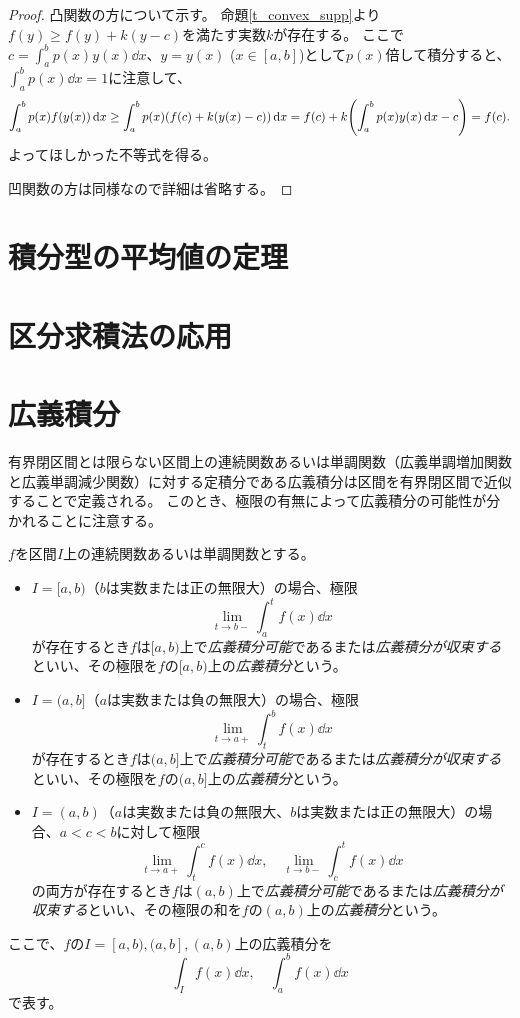 \begin{proof}
凸関数の方について示す。
命題\ref{t_convex_supp}より$f(y) \ge f(y)+k(y-c)$を満たす実数$k$が存在する。
ここで$c = \int_a^b p(x)y(x)\dd{x}$、$y = y(x)$ ($x \in [a, b]$)として$p(x)$倍して積分すると、$\int_a^b p(x)\dd{x} = 1$に注意して、
$$
\int_a^b p(x)f(y(x))\dd{x} \ge \int_a^b p(x)(f(c)+k(y(x)-c))\dd{x} = f(c)+k\qty(\int_a^b p(x)y(x)\dd{x}-c) = f(c).
$$
よってほしかった不等式を得る。

凹関数の方は同様なので詳細は省略する。
\end{proof}

\section{積分型の平均値の定理}

\section{区分求積法の応用}

\section{広義積分}

有界閉区間とは限らない区間上の連続関数あるいは単調関数（広義単調増加関数と広義単調減少関数）に対する定積分である広義積分は区間を有界閉区間で近似することで定義される。
このとき、極限の有無によって広義積分の可能性が分かれることに注意する。

\begin{definition}[広義積分]
$f$を区間$I$上の連続関数あるいは単調関数とする。
\begin{itemize}
\item
$I = [a, b)$（$b$は実数または正の無限大）の場合、極限
$$
\lim_{t \to b-}\int_a^t f(x)\dd{x}
$$
が存在するとき$f$は$[a, b)$上で\emph{広義積分可能}であるまたは\emph{広義積分が収束する}といい、その極限を$f$の$[a, b)$上の\emph{広義積分}という。
\item
$I = (a, b]$（$a$は実数または負の無限大）の場合、極限
$$
\lim_{t \to a+}\int_t^b f(x)\dd{x}
$$
が存在するとき$f$は$(a, b]$上で\emph{広義積分可能}であるまたは\emph{広義積分が収束する}といい、その極限を$f$の$(a, b]$上の\emph{広義積分}という。
\item
$I = (a, b)$（$a$は実数または負の無限大、$b$は実数または正の無限大）の場合、$a < c < b$に対して極限
$$
\lim_{t \to a+}\int_t^c f(x)\dd{x}, \quad \lim_{t \to b-}\int_c^t f(x)\dd{x} 
$$
の両方が存在するとき$f$は$(a, b)$上で\emph{広義積分可能}であるまたは\emph{広義積分が収束する}といい、その極限の和を$f$の$(a, b)$上の\emph{広義積分}という。
\end{itemize}
ここで、$f$の$I = [a, b), (a, b], (a, b)$上の広義積分を
$$
\int_I f(x)\dd{x},
\quad \int_a^b f(x)\dd{x}
$$
で表す。
\end{definition}

